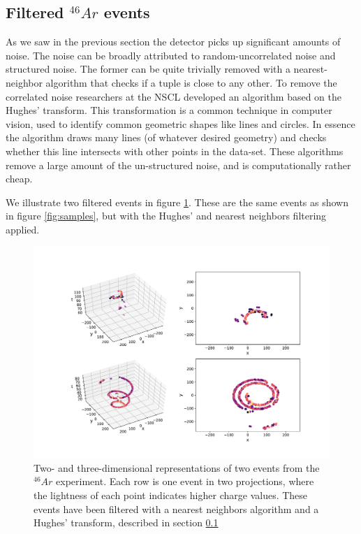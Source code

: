 \subsection{Filtered \texorpdfstring{${}^{46}Ar$}{46Ar} events}\label{sec:filtered}

As we saw in the previous section the detector picks up significant amounts of noise. The noise can be broadly attributed to random-uncorrelated noise and structured noise. The former can be quite trivially removed with a nearest-neighbor algorithm that checks if a tuple is close to any other. To remove the correlated noise researchers at the NSCL developed an algorithm based on the Hughes' transform. This transformation is a common technique in computer vision, used to identify common geometric shapes like lines and circles. In essence the algorithm draws many lines (of whatever desired geometry) and checks whether this line intersects with other points in the data-set. These algorithms remove a large amount of the un-structured noise, and is computationally rather cheap.

We illustrate two filtered events in figure \ref{fig:samples_filtered}. These are the same events as shown in figure \ref{fig:samples}, but with the Hughes' and nearest neighbors filtering applied. 

\begin{figure}[H]
\centering
\includegraphics[width=\textwidth]{../plots/display_eventsclean_.pdf}
\caption[Displaying filtered events in 2D and 3D]{Two- and three-dimensional representations of two events from the ${}^{46}Ar$ experiment. Each row is one event in two projections, where the lightness of each point indicates higher charge values. These events have been filtered with a nearest neighbors algorithm and a Hughes' transform, described in section \ref{sec:filtered}}\label{fig:samples_filtered}
\end{figure}

